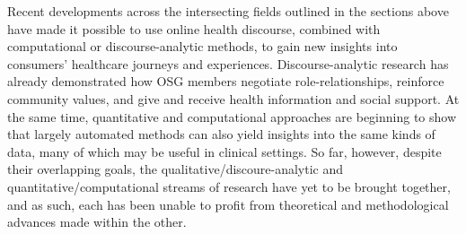 


Recent developments across the intersecting fields outlined in the sections above have made it possible to use online health discourse, combined with computational or discourse\hyp{}analytic methods, to gain new insights into consumers' healthcare journeys and experiences. Discourse-analytic research has already demonstrated how \gls{OSG} \glspl{member} negotiate role\hyp{}relationships, reinforce community values, and give and receive health information and social support. At the same time, quantitative and computational approaches are beginning to show that largely automated methods can also yield insights into the same kinds of data, many of which may be useful in clinical settings. So far, however, despite their overlapping goals, the qualitative\slash discoure\hyp{}analytic and quantitative\slash computational streams of research have yet to be brought together, and as such, each has been unable to profit from theoretical and methodological advances made within the other.


